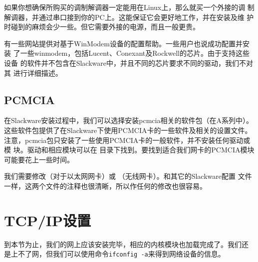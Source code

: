 如果你想确保所购买的调制解调器一定能用在Linux上，那么就买一个外接的调
制解调器，并通过串口接到你的PC上。这能保证它会更好地工作，并在安装及维
护时碰到的麻烦会少一些。但它需要外接的电源，而且一般更贵。

有一些网站提供对基于WinModem设备的配置帮助。一些用户也说成功配置并安装
了一些winmodem，包括Lucent、Conexant及Rockwell的芯片。由于支持这些设备
的软件并不包含在Slackware中，并且不同的芯片要求不同的驱动，我们不对其
进行详细描述。

\subsection{PCMCIA}
\label{sec:networkConfiguration:hardware:pcmcia}
在Slackware安装过程中，我们可以选择安装pcmcia相关的软件包（在A系列中）。
这些软件包提供了在Slackware下使用PCMCIA卡的一些软件及相关的设置文件。
注意，pcmcia包只安装了一些使用PCMCIA卡的一般软件，并不安装任何驱动或模
块。驱动和相应模块可以在
目录下找到。要找到适合我们网卡的PCMCIA模块可能要花上一些时间。

我们需要修改（对于以太网网卡）或
（无线网卡）。和其它的Slackware配置
文件一样，这两个文件的注释也很清晰，所以作任何的修改也很容易。

\section{TCP/IP设置}
\label{sec:networkConfiguration:tcpIP}

到本节为止，我们的网上应该安装完毕，相应的内核模块也加载完成了。我们还
是上不了网，但我们可以使用命令\texttt{ifconfig -a}来得到网络设备的信息。

